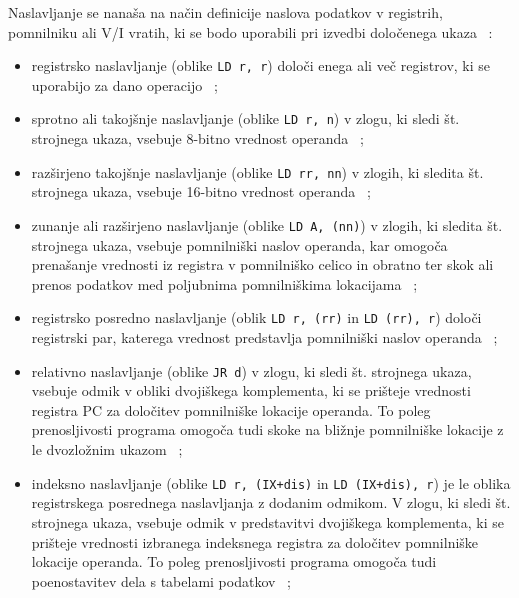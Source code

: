 \documentclass[a4paper, 12pt, openright]{book}
\begin{document}
    Naslavljanje se nanaša na način definicije naslova podatkov v registrih, pomnilniku
    ali V/I vratih, ki se bodo uporabili pri izvedbi določenega ukaza ~\cite{z80cpuusermanual}:
    \begin{itemize}
        \item registrsko naslavljanje (oblike \texttt{LD r, r}) določi enega ali
            več registrov, ki se uporabijo za dano operacijo ~\cite{strojnijezikzaprocesorz80,
            z80cpuusermanual};

        \item sprotno ali takojšnje naslavljanje (oblike \texttt{LD r, n}) v
            zlogu, ki sledi št. strojnega ukaza, vsebuje 8-bitno vrednost operanda
            ~\cite{strojnijezikzaprocesorz80, z80cpuusermanual};

        \item razširjeno takojšnje naslavljanje (oblike \texttt{LD rr, nn}) v
            zlogih, ki sledita št. strojnega ukaza, vsebuje 16-bitno vrednost operanda
            ~\cite{z80cpuusermanual};

        \item zunanje ali razširjeno naslavljanje (oblike \texttt{LD A, (nn)}) v
            zlogih, ki sledita št. strojnega ukaza, vsebuje pomnilniški naslov operanda,
            kar omogoča prenašanje vrednosti iz registra v pomnilniško celico in
            obratno ter skok ali prenos podatkov med poljubnima pomnilniškima
            lokacijama ~\cite{strojnijezikzaprocesorz80, z80cpuusermanual};

        \item registrsko posredno naslavljanje (oblik \texttt{LD r, (rr)} in \texttt{LD
            (rr), r}) določi registrski par, katerega vrednost predstavlja
            pomnilniški naslov operanda ~\cite{strojnijezikzaprocesorz80, z80cpuusermanual};

        \item relativno naslavljanje (oblike \texttt{JR d}) v zlogu, ki sledi št.
            strojnega ukaza, vsebuje odmik v obliki dvojiškega komplementa, ki
            se prišteje vrednosti registra PC za določitev pomnilniške lokacije
            operanda. To poleg prenosljivosti programa omogoča tudi skoke na bližnje
            pomnilniške lokacije z le dvozložnim ukazom ~\cite{z80cpuusermanual};

        \item indeksno naslavljanje (oblike \texttt{LD r, (IX+dis)} in \texttt{LD
            (IX+dis), r}) je le oblika registrskega posrednega naslavljanja z dodanim
            odmikom. V zlogu, ki sledi št. strojnega ukaza, vsebuje odmik v predstavitvi
            dvojiškega komplementa, ki se prišteje vrednosti izbranega
            indeksnega registra za določitev pomnilniške lokacije operanda. To poleg
            prenosljivosti programa omogoča tudi poenostavitev dela s tabelami podatkov
            ~\cite{strojnijezikzaprocesorz80, z80cpuusermanual};


\end{itemize}
\end{document}
